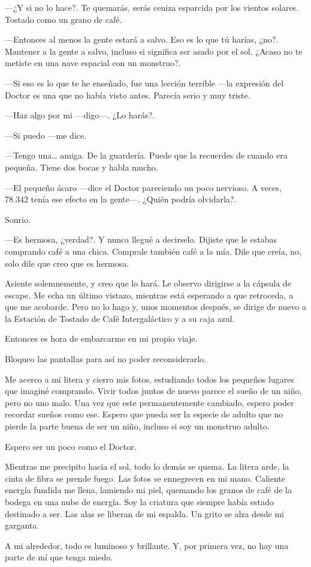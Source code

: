 ---¿Y si no lo hace?. Te quemarás, serás ceniza esparcida por los
vientos solares. Tostado como un grano de café.

---Entonces al menos la gente estará a salvo. Eso es lo que tú harías,
¿no?. Mantener a la gente a salvo, incluso si significa ser asado por el
sol. ¿Acaso no te metiste en una nave espacial con un monstruo?.

---Si eso es lo que te he enseñado, fue una lección terrible ---la
expresión del Doctor es una que no había visto antes. Parecía serio y
muy triste.

---Haz algo por mi ---digo---. ¿Lo harás?.

---Si puedo ---me dice.

---Tengo una\ldots{} amiga. De la guardería. Puede que la recuerdes de
cuando era pequeña. Tiene dos bocas y habla mucho.

---El pequeño ácaro ---dice el Doctor pareciendo un poco nervioso. A
veces, 78.342 tenía ese efecto en la gente---. ¿Quién podría olvidarla?.

Sonrio.

---Es hermosa, ¿verdad?. Y nunca llegué a decirselo. Dijiste que le
estabas comprando café a una chica. Comprale también café a la mía. Dile
que creía, no, solo dile que creo que es hermosa.

Asiente solemnemente, y creo que lo hará. Le observo dirigirse a la
cápsula de escape. Me echa un último vistazo, mientras está esperando a
que retroceda, a que me acobarde. Pero no lo hago y, unos momentos
después, se dirige de nuevo a la Estación de Tostado de Café
Intergaláctico y a su caja azul.

Entonces es hora de embarcarme en mi propio viaje.

Bloqueo las pantallas para así no poder reconsiderarlo.

Me acerco a mi litera y cierro mis fotos, estudiando todos los pequeños
lugares que imaginé comprando. Vivir todos juntos de nuevo parece el
sueño de un niño, pero no uno malo. Una vez que este permanentemente
cambiado, espero poder recordar sueños como ese. Espero que pueda ser la
especie de adulto que no pierde la  parte buena de ser un niño, incluso
si soy un monstruo adulto.

Espero ser un poco como el Doctor.

Mientras me precipito hacia el sol, todo lo demás se quema. La litera
arde, la cinta de fibra se prende fuego. Las fotos se ennegrecen en mi
mano. Caliente energía fundida me llena, lamiendo mi piel, quemando los
granos de café de la bodega en una nube de energía. Soy la criatura que
siempre había estado destinado a ser. Las alas se liberan de mi
espalda. Un grito se alza desde mi garganta.

A mi alrededor, todo es luminoso y brillante. Y, por primera vez, no hay
una parte de mí que tenga miedo.